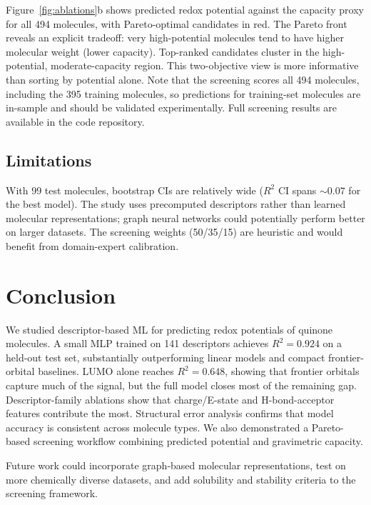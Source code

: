\documentclass[11pt]{article}
\begin{document}
Figure~\ref{fig:ablations}b shows predicted redox potential against the capacity proxy for all 494 molecules, with Pareto-optimal candidates in red. The Pareto front reveals an explicit tradeoff: very high-potential molecules tend to have higher molecular weight (lower capacity). Top-ranked candidates cluster in the high-potential, moderate-capacity region. This two-objective view is more informative than sorting by potential alone. Note that the screening scores all 494 molecules, including the 395 training molecules, so predictions for training-set molecules are in-sample and should be validated experimentally. Full screening results are available in the code repository.

\subsection{Limitations}

With 99 test molecules, bootstrap CIs are relatively wide ($R^2$ CI spans ${\sim}0.07$ for the best model). The study uses precomputed descriptors rather than learned molecular representations; graph neural networks could potentially perform better on larger datasets. The screening weights (50/35/15) are heuristic and would benefit from domain-expert calibration.

\section{Conclusion}

We studied descriptor-based ML for predicting redox potentials of quinone molecules. A small MLP trained on 141 descriptors achieves $R^2 = 0.924$ on a held-out test set, substantially outperforming linear models and compact frontier-orbital baselines. LUMO alone reaches $R^2 = 0.648$, showing that frontier orbitals capture much of the signal, but the full model closes most of the remaining gap. Descriptor-family ablations show that charge/E-state and H-bond-acceptor features contribute the most. Structural error analysis confirms that model accuracy is consistent across molecule types. We also demonstrated a Pareto-based screening workflow combining predicted potential and gravimetric capacity.

Future work could incorporate graph-based molecular representations, test on more chemically diverse datasets, and add solubility and stability criteria to the screening framework.
\end{document}
